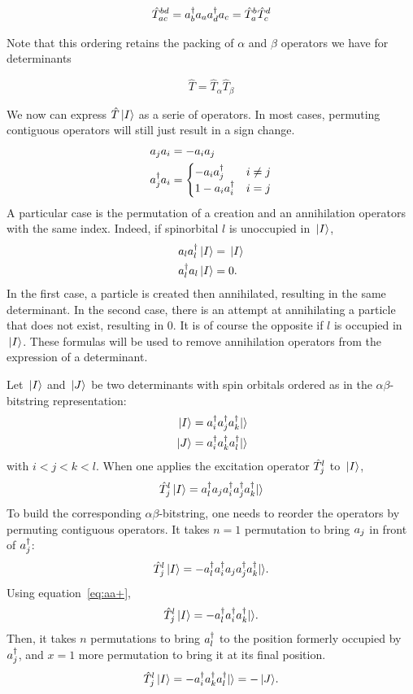 \documentclass[./thesis.tex]{subfiles}
\begin{document}
$$\hat T_{ac}^{bd} = a^\dagger_{b} a_{a} a^\dagger_{d} a_{c} = \hat T_a^b \hat T_c^d$$

Note that this ordering retains the packing of $\alpha$ and $\beta$ operators we have for determinants

\begin{equation}
\label{eq:spinpackexc}
\hat T = \hat T_\alpha \hat T_\beta
\end{equation}

We now can express $\hat T {\ket*{I}}$ as a serie of operators.
In most cases, permuting contiguous operators will still just result in a sign change.
\begin{align*}
a_{j} a_{i} & = -a_{i} a_{j} \\
a^\dagger_{j} a_{i} & =
  \begin{cases}
  -a_{i} a^\dagger_{j} & i \ne j \\
  1 - a_{i} a^\dagger_{i} & i = j
  \end{cases}
\end{align*}
A particular case is the permutation of a creation and an annihilation operators with the same index.
Indeed, if spinorbital $l$ is unoccupied in ${\ket*{I}}$,
\begin{align}
\label{eq:aa+}
a_{l} a^\dagger_{l} {\ket*{I}} & = {\ket*{I}}  \\
a^\dagger_{l} a_{l} {\ket*{I}} & = 0 .
\end{align}
In the first case, a particle is created then annihilated, resulting in the same determinant. In the second case, there is an attempt at annihilating a particle that does not exist, resulting in $0$. It is of course the opposite if $l$ is occupied in ${\ket*{I}}$.
These formulas will be used to remove annihilation operators from the expression of a determinant.



Let ${\ket*{I}}$ and ${\ket*{J}}$ be two determinants with spin orbitals ordered as in the $\alpha \beta$-bitstring  representation:
\begin{align*}
{\ket*{I}} & = a^\dagger_{i}a^\dagger_{j}a^\dagger_{k} {\ket{}} \\
{\ket*{J}} & = a^\dagger_{i}a^\dagger_{k}a^\dagger_{l} {\ket{}}
\end{align*}
with $i<j<k<l$.
When one applies the excitation operator ${\hat{T}_{j}^{l}}$ to ${\ket*{I}}$,
$${\hat{T}_{j}^{l}} {\ket*{I}} = a^\dagger_{l} a_{j} a^\dagger_{i} a^\dagger_{j} a^\dagger_{k} {\ket{}} $$
To build the corresponding $\alpha \beta$-bitstring, one needs to
reorder the operators by permuting contiguous operators.
It takes $n=1$ permutation to bring $a_{j}$ in front of $a^\dagger_{j}$:
$${\hat{T}_{j}^{l}} {\ket*{I}} = -a^\dagger_{l} a^\dagger_{i} a_{j} a^\dagger_{j} a^\dagger_{k} {\ket{}}.$$
Using equation~\ref{eq:aa+},
$${\hat{T}_{j}^{l}} {\ket*{I}} = -a^\dagger_{l} a^\dagger_{i} a^\dagger_{k} {\ket{}}.$$
Then, it takes $n$ permutations to bring $a^\dagger_{l}$ to the position formerly occupied by $a^\dagger_{j}$, and $x=1$ more permutation to bring it at its final position.
$${\hat{T}_{j}^{l}} {\ket*{I}} = -a^\dagger_{i} a^\dagger_{k} a^\dagger_{l} {\ket{}} = -{\ket*{J}}.$$
\end{document}
